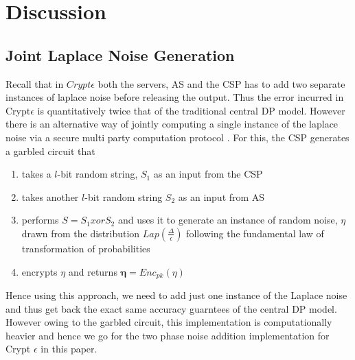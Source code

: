 \section{Discussion}
\subsection{Joint Laplace Noise Generation}
Recall that in $Crypt\epsilon$ both the servers, AS and the CSP has to add two separate instances of laplace noise before releasing the output. Thus the error incurred in Crypt$\epsilon$ is quantitatively twice that of the traditional central DP model. However there is an alternative way of jointly computing a single instance of the laplace noise via a secure multi party computation protocol \cite{Djoin}. For this, the CSP generates a garbled circuit that \begin{enumerate}[label=(\alph*)]\item takes a $l$-bit random string, $S_1$ as an input from the CSP
    \item takes another $l$-bit random string $S_2$ as an input from AS \item performs $S=S_1 xor S_2$  and uses it to generate an instance of random noise, $\eta$ drawn from the distribution $Lap(\frac{\Delta}{\epsilon})$ following the fundamental law of transformation of probabilities \item encrypts $\eta$ and returns $\boldsymbol{\eta}=Enc_{pk}(\eta)$\end{enumerate}
Hence using this approach, we need to add just one instance of the Laplace noise and thus get back the exact same accuracy guarntees of the central DP model. However owing to the garbled circuit, this implementation is computationally heavier and hence we go for the two phase noise addition implementation for Crypt $\epsilon$ in this paper.
